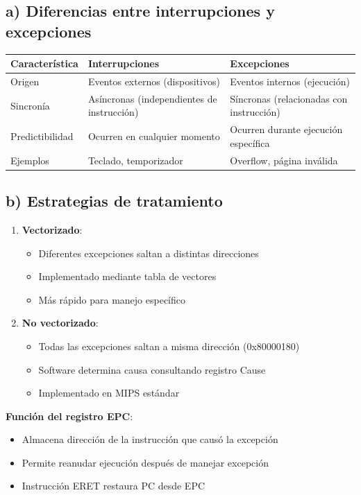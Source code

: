\documentclass[12pt]{article}
\begin{document}
\subsection*{a) Diferencias entre interrupciones y excepciones}
\begin{table}[h]
\centering
\begin{tabular}{|l|l|l|}
\hline
\textbf{Característica} & \textbf{Interrupciones} & \textbf{Excepciones} \\
\hline
Origen & Eventos externos (dispositivos) & Eventos internos (ejecución) \\
\hline
Sincronía & Asíncronas (independientes de instrucción) & Síncronas (relacionadas con instrucción) \\
\hline
Predictibilidad & Ocurren en cualquier momento & Ocurren durante ejecución específica \\
\hline
Ejemplos & Teclado, temporizador & Overflow, página inválida \\
\hline
\end{tabular}
\end{table}

\subsection*{b) Estrategias de tratamiento}
\begin{enumerate}
    \item \textbf{Vectorizado}:
    \begin{itemize}
        \item Diferentes excepciones saltan a distintas direcciones
        \item Implementado mediante tabla de vectores
        \item Más rápido para manejo específico
    \end{itemize}
    
    \item \textbf{No vectorizado}:
    \begin{itemize}
        \item Todas las excepciones saltan a misma dirección (0x80000180)
        \item Software determina causa consultando registro Cause
        \item Implementado en MIPS estándar
    \end{itemize}
\end{enumerate}

\textbf{Función del registro EPC}:
\begin{itemize}
    \item Almacena dirección de la instrucción que causó la excepción
    \item Permite reanudar ejecución después de manejar excepción
    \item Instrucción ERET restaura PC desde EPC
\end{itemize}
\end{document}
